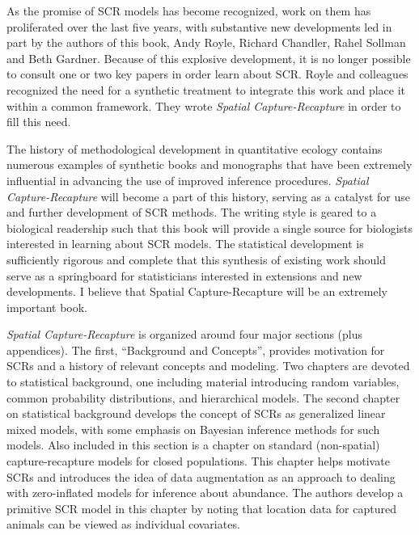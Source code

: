 As the promise of SCR models has become
recognized, work on them has proliferated over the last five years,
with substantive new developments led in part by the authors of this
book, Andy Royle, Richard Chandler, Rahel Sollman and Beth
Gardner. Because of this explosive development, it is no longer
possible to consult one or two key papers in order learn about
SCR. Royle and colleagues recognized the need for a synthetic
treatment to integrate this work and place it within a common
framework. They wrote {\it Spatial Capture-Recapture} in order to fill this
need.  

The history of methodological development in quantitative
ecology contains numerous examples of synthetic books and monographs
that have been extremely influential in advancing the use of improved
inference procedures. {\it Spatial Capture-Recapture} will become a part of
this history, serving as a catalyst for use and further development of
SCR methods. The writing style is geared to a biological readership
such that this book will provide a single source for biologists
interested in learning about SCR models. The statistical development
is sufficiently rigorous and complete that this synthesis of existing
work should serve as a springboard for statisticians interested in
extensions and new developments. I believe that Spatial
Capture-Recapture will be an extremely important book.  

{\it Spatial
Capture-Recapture} is organized around four major sections (plus
appendices). The first, ``Background and Concepts'', provides motivation
for SCRs and a history of relevant concepts and modeling. Two chapters
are devoted to statistical background, one including material
introducing random variables, common probability distributions, and
hierarchical models. The second chapter on statistical background
develops the concept of SCRs as generalized linear mixed models, with
some emphasis on Bayesian inference methods for such models. Also
included in this section is a chapter on standard (non-spatial)
capture-recapture models for closed populations. This chapter helps
motivate SCRs and introduces the idea of data augmentation as an
approach to dealing with zero-inflated models for inference about
abundance. The authors develop a primitive SCR model in this chapter
by noting that location data for captured animals can be viewed as
individual covariates.  


